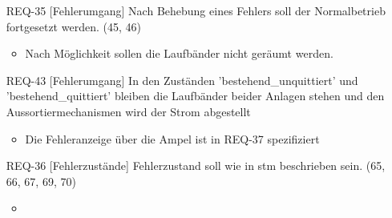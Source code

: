 \begin{itemize}
\begin{itemize}
    \end{itemize}
    \item[REQ-35][Fehlerumgang] Nach Behebung eines Fehlers soll der Normalbetrieb fortgesetzt werden. (45, 46)
    \begin{itemize}
        \item Nach Möglichkeit sollen die Laufbänder nicht geräumt werden.
    \end{itemize}
    \item[REQ-43][Fehlerumgang] In den Zuständen 'bestehend\_unquittiert' und 'bestehend\_quittiert' bleiben die Laufbänder beider Anlagen stehen und den Aussortiermechanismen wird der Strom abgestellt
    \begin{itemize}
        \item Die Fehleranzeige über die Ampel ist in REQ-37 spezifiziert
    \end{itemize}
    \item[REQ-36][Fehlerzustände] Fehlerzustand soll wie in stm beschrieben sein. (65, 66, 67, 69, 70)
    \begin{itemize}
        \item
    \end{itemize}

\end{itemize}